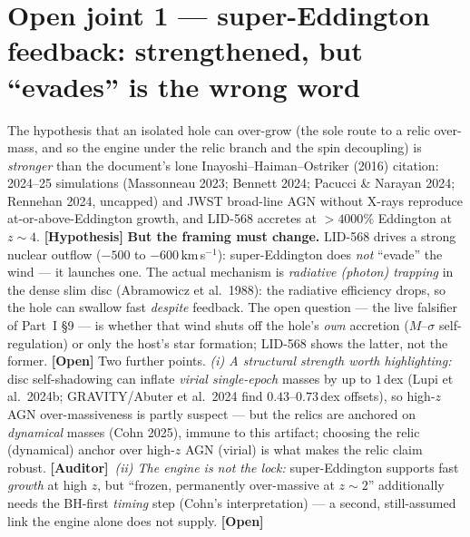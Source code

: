 \documentclass[11pt]{article}
\newcommand{\Hyp}{\textbf{\textcolor{blue!55!black}{[Hypothesis]}}}
\newcommand{\Open}{\textbf{\textcolor{gray!10!black}{[Open]}}}
\newcommand{\Auditor}{\textbf{\textcolor{teal!55!black}{[Auditor]}}}
\begin{document}
\section{Open joint 1 --- super-Eddington feedback: strengthened, but ``evades'' is the wrong word}
The hypothesis that an isolated hole can over-grow (the sole route to a relic over-mass, and so the engine under the relic branch and the spin decoupling) is \emph{stronger} than the document's lone Inayoshi--Haiman--Ostriker (2016) citation: 2024--25 simulations (Massonneau 2023; Bennett 2024; Pacucci \& Narayan 2024; Rennehan 2024, uncapped) and JWST broad-line AGN without X-rays reproduce at-or-above-Eddington growth, and LID-568 accretes at $>4000\%$ Eddington at $z\sim4$. \Hyp
\textbf{But the framing must change.} LID-568 drives a strong nuclear outflow ($-500$ to $-600$\,km\,s$^{-1}$): super-Eddington does \emph{not} ``evade'' the wind --- it launches one. The actual mechanism is \emph{radiative (photon) trapping} in the dense slim disc (Abramowicz et al.\ 1988): the radiative efficiency drops, so the hole can swallow fast \emph{despite} feedback. The open question --- the live falsifier of Part~I \S9 --- is whether that wind shuts off the hole's \emph{own} accretion ($M$--$\sigma$ self-regulation) or only the host's star formation; LID-568 shows the latter, not the former. \Open
Two further points. \emph{(i) A structural strength worth highlighting:} disc self-shadowing can inflate \emph{virial single-epoch} masses by up to $1$\,dex (Lupi et al.\ 2024b; GRAVITY/Abuter et al.\ 2024 find $0.43$--$0.73$\,dex offsets), so high-$z$ AGN over-massiveness is partly suspect --- but the relics are anchored on \emph{dynamical} masses (Cohn 2025), immune to this artifact; choosing the relic (dynamical) anchor over high-$z$ AGN (virial) is what makes the relic claim robust. \Auditor\ \emph{(ii) The engine is not the lock:} super-Eddington supports fast \emph{growth} at high $z$, but ``frozen, permanently over-massive at $z\sim2$'' additionally needs the BH-first \emph{timing} step (Cohn's interpretation) --- a second, still-assumed link the engine alone does not supply. \Open
\end{document}
